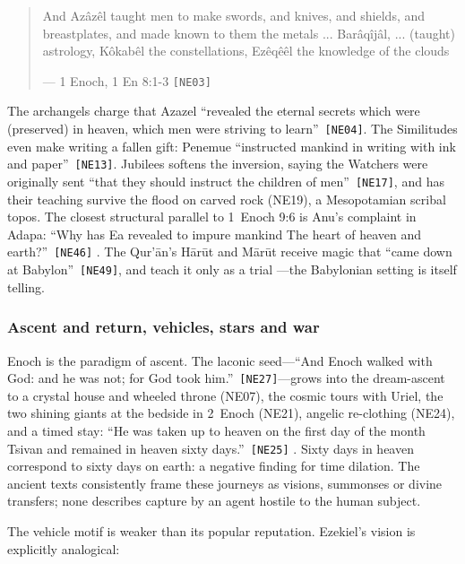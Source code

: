 \documentclass[11pt,a4paper]{article}
\newcommand{\pid}[1]{\texttt{\small #1}}
\begin{document}
\begin{quote}\small And Azâzêl taught men to make swords, and knives, and shields, and breastplates, and made known to them the metals ... Barâqîjâl, ... (taught) astrology, Kôkabêl the constellations, Ezêqêêl the knowledge of the clouds\par\hfill{\footnotesize --- 1 Enoch, 1 En 8:1-3 \pid{[NE03]}}\end{quote}

The archangels charge that Azazel \enquote{revealed the eternal secrets which were (preserved) in heaven, which men were striving to learn}~\pid{[NE04]}. The Similitudes even make writing a fallen gift: Penemue \enquote{instructed mankind in writing with ink and paper}~\pid{[NE13]}. Jubilees softens the inversion, saying the Watchers were originally sent \enquote{that they should instruct the children of men}~\pid{[NE17]}, and has their teaching survive the flood on carved rock (NE19), a Mesopotamian scribal topos. The closest structural parallel to 1~Enoch 9:6 is Anu's complaint in Adapa: \enquote{Why has Ea revealed to impure mankind The heart of heaven and earth?}~\pid{[NE46]} \parencite{rogers1912cuneiform}. The Qur'ān's Hārūt and Mārūt receive magic that \enquote{came down at Babylon}~\pid{[NE49]}, and teach it only as a trial \parencite{yusufali1934quran}---the Babylonian setting is itself telling.

\subsubsection{Ascent and return, vehicles, stars and war}

Enoch is the paradigm of ascent. The laconic seed---\enquote{And Enoch walked with God: and he was not; for God took him.}~\pid{[NE27]}---grows into the dream-ascent to a crystal house and wheeled throne (NE07), the cosmic tours with Uriel, the two shining giants at the bedside in 2~Enoch (NE21), angelic re-clothing (NE24), and a timed stay: \enquote{He was taken up to heaven on the first day of the month Tsivan and remained in heaven sixty days.}~\pid{[NE25]} \parencite{morfill1896secrets}. Sixty days in heaven correspond to sixty days on earth: a negative finding for time dilation. The ancient texts consistently frame these journeys as visions, summonses or divine transfers; none describes capture by an agent hostile to the human subject.

The vehicle motif is weaker than its popular reputation. Ezekiel's vision is explicitly analogical:
\end{document}
